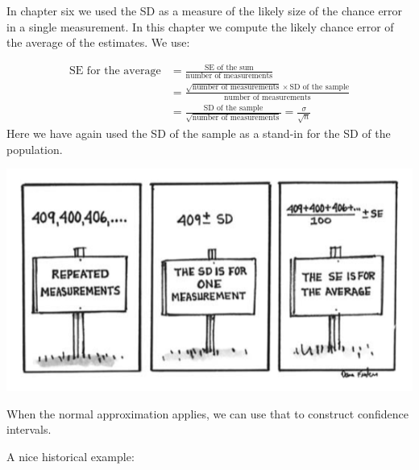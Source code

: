 \documentclass[
]{book}
\begin{document}
In chapter six we used the SD as a measure of the likely size of the chance error in a single measurement. In this chapter we compute the likely chance error of the average of the estimates. We use:

\[
\begin{aligned}
\text{SE for the average} &= \frac{\text{SE of the sum}}{\text{number of measurements}} \\ &=\frac{\sqrt{\text{number of measurements}}\times \text{SD of the sample}}{\text{number of measurements}}\\
&=\frac{ \text{SD of the sample}}{\sqrt{\text{number of measurements}}}=\frac{\sigma}{\sqrt{n}}
\end{aligned}
\]
Here we have again used the SD of the sample as a stand-in for the SD of the population.

\includegraphics{images/Ch24Img01.png}

When the normal approximation applies, we can use that to construct confidence intervals.

A nice historical example:
\end{document}
